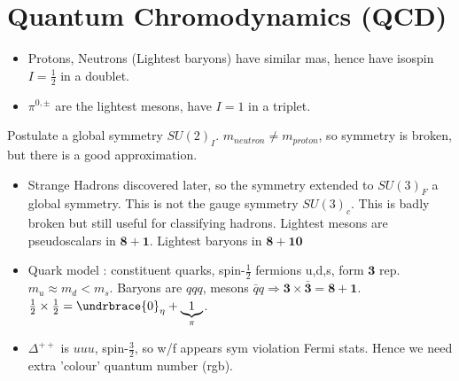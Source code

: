 \documentclass{article}
\begin{document}
\section{Quantum Chromodynamics (QCD)}

\begin{itemize}
    \item Protons, Neutrons (Lightest baryons) have similar mas, hence have isospin $I= \frac{1}{2}$ in a doublet. 
    \item $\pi^{0,\pm}$ are the lightest mesons, have $I=1$ in a triplet. 
\end{itemize}
Postulate a global symmetry $SU(2)_I$. $m_{neutron} \neq m_{proton}$, so symmetry is broken, but there is a good approximation. 
\begin{itemize}
    \item Strange Hadrons discovered later, so the symmetry extended to $SU(3)_F$ a global symmetry. This is not the gauge symmetry $SU(3)_c$. This is badly broken but still useful for classifying hadrons. Lightest mesons are pseudoscalars in $\bm{8} + \bm{1}$. Lightest baryons in $\bm{8} + \bm{10}$
    \item Quark model : constituent quarks, spin-$\frac{1}{2}$ fermions u,d,s, form $\bm{3}$ rep. $m_u \approx m_d < m_s$. Baryons are $qqq$, mesons $\bar{q}q \Rightarrow \bm{3} \times \bar{\bm{3}} = \bm{8} + \bm{1}$. $\frac{1}{2} \times \frac{1}{2} = \undrbrace{0}_{\eta} + \underbrace{1}_{\pi}$.
    \item $\Delta^{++}$ is $uuu$, spin-$\frac{3}{2}$, so w/f appears sym violation Fermi stats. Hence we need extra 'colour' quantum number (rgb). 
\end{itemize}
\end{document}
